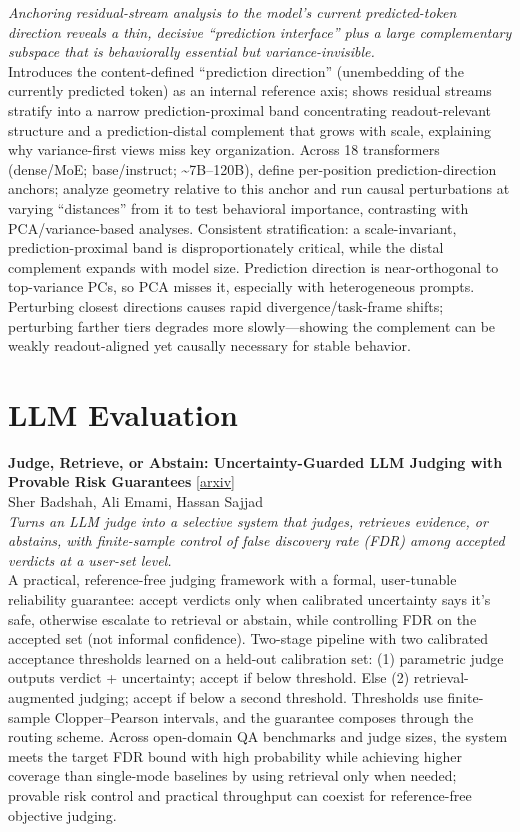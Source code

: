 \documentclass[12pt,letterpaper]{article}
\begin{document}
{\small\textit{Anchoring residual-stream analysis to the model's current predicted-token direction reveals a thin, decisive ``prediction interface'' plus a large complementary subspace that is behaviorally essential but variance-invisible.}}\\[1pt]
{\footnotesize Introduces the content-defined ``prediction direction'' (unembedding of the currently predicted token) as an internal reference axis; shows residual streams stratify into a narrow prediction-proximal band concentrating readout-relevant structure and a prediction-distal complement that grows with scale, explaining why variance-first views miss key organization. Across 18 transformers (dense/MoE; base/instruct; \textasciitilde{}7B--120B), define per-position prediction-direction anchors; analyze geometry relative to this anchor and run causal perturbations at varying ``distances'' from it to test behavioral importance, contrasting with PCA/variance-based analyses. Consistent stratification: a scale-invariant, prediction-proximal band is disproportionately critical, while the distal complement expands with model size. Prediction direction is near-orthogonal to top-variance PCs, so PCA misses it, especially with heterogeneous prompts. Perturbing closest directions causes rapid divergence/task-frame shifts; perturbing farther tiers degrades more slowly---showing the complement can be weakly readout-aligned yet causally necessary for stable behavior.}

\medskip


\section*{LLM Evaluation}

{\small\textbf{Judge, Retrieve, or Abstain: Uncertainty-Guarded LLM Judging with Provable Risk Guarantees}} {\scriptsize[\href{https://arxiv.org/abs/2608.17994}{arxiv}]}\\
{\scriptsize Sher Badshah, Ali Emami, Hassan Sajjad}\\

{\small\textit{Turns an LLM judge into a selective system that judges, retrieves evidence, or abstains, with finite-sample control of false discovery rate (FDR) among accepted verdicts at a user-set level.}}\\[1pt]
{\footnotesize A practical, reference-free judging framework with a formal, user-tunable reliability guarantee: accept verdicts only when calibrated uncertainty says it's safe, otherwise escalate to retrieval or abstain, while controlling FDR on the accepted set (not informal confidence). Two-stage pipeline with two calibrated acceptance thresholds learned on a held-out calibration set: (1) parametric judge outputs verdict + uncertainty; accept if below threshold. Else (2) retrieval-augmented judging; accept if below a second threshold. Thresholds use finite-sample Clopper--Pearson intervals, and the guarantee composes through the routing scheme. Across open-domain QA benchmarks and judge sizes, the system meets the target FDR bound with high probability while achieving higher coverage than single-mode baselines by using retrieval only when needed; provable risk control and practical throughput can coexist for reference-free objective judging.}
\end{document}
